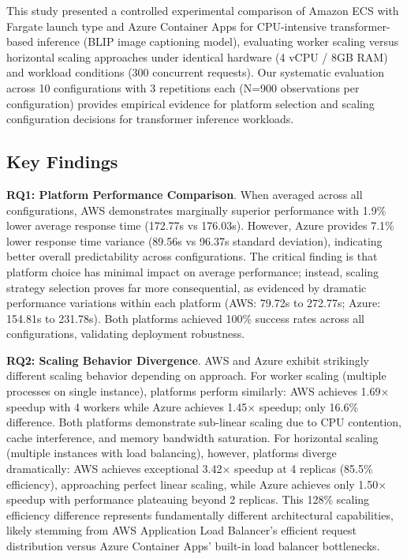 This study presented a controlled experimental comparison of Amazon ECS with Fargate launch type and Azure Container Apps for CPU-intensive transformer-based inference (BLIP image captioning model), evaluating worker scaling versus horizontal scaling approaches under identical hardware (4 vCPU / 8GB RAM) and workload conditions (300 concurrent requests). Our systematic evaluation across 10 configurations with 3 repetitions each (N=900 observations per configuration) provides empirical evidence for platform selection and scaling configuration decisions for transformer inference workloads.

\subsection{Key Findings}

\textbf{RQ1: Platform Performance Comparison}. When averaged across all configurations, AWS demonstrates marginally superior performance with 1.9\% lower average response time (172.77s vs 176.03s). However, Azure provides 7.1\% lower response time variance (89.56s vs 96.37s standard deviation), indicating better overall predictability across configurations. The critical finding is that platform choice has minimal impact on average performance; instead, scaling strategy selection proves far more consequential, as evidenced by dramatic performance variations within each platform (AWS: 79.72s to 272.77s; Azure: 154.81s to 231.78s). Both platforms achieved 100\% success rates across all configurations, validating deployment robustness.

\textbf{RQ2: Scaling Behavior Divergence}. AWS and Azure exhibit strikingly different scaling behavior depending on approach. For worker scaling (multiple processes on single instance), platforms perform similarly: AWS achieves 1.69× speedup with 4 workers while Azure achieves 1.45× speedup; only 16.6\% difference. Both platforms demonstrate sub-linear scaling due to CPU contention, cache interference, and memory bandwidth saturation. For horizontal scaling (multiple instances with load balancing), however, platforms diverge dramatically: AWS achieves exceptional 3.42× speedup at 4 replicas (85.5\% efficiency), approaching perfect linear scaling, while Azure achieves only 1.50× speedup with performance plateauing beyond 2 replicas. This 128\% scaling efficiency difference represents fundamentally different architectural capabilities, likely stemming from AWS Application Load Balancer's efficient request distribution versus Azure Container Apps' built-in load balancer bottlenecks.

